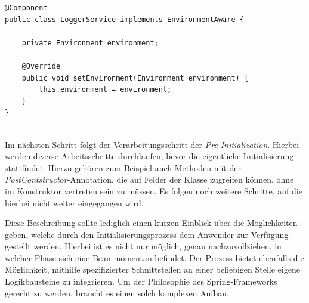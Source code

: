 \begin{lstlisting}[style=javaStyle,caption={Bean - EnvironmentAware \cite{bean-aware}},label=lst:bean-aware]
@Component
public class LoggerService implements EnvironmentAware {

	private Environment environment;

	@Override
	public void setEnvironment(Environment environment) {
		this.environment = environment;
	}
}


\end{lstlisting}
Im nächsten Schritt folgt der Verarbeitungsschritt der \emph{Pre-Initialization}. Hierbei werden diverse Arbeitsschritte durchlaufen, bevor die eigentliche Initialisierung stattfindet. Hierzu gehören zum Beispiel auch Methoden mit der \emph{PostContstructor}-Annotation, die auf Felder der Klasse zugreifen können, ohne im Konstruktor vertreten sein zu müssen. Es folgen noch weitere Schritte, auf die hierbei nicht weiter eingegangen wird. 

Diese Beschreibung sollte lediglich einen kurzen Einblick über die Möglichkeiten geben, welche durch den Initialisierungsprozess dem Anwender zur Verfügung gestellt werden. Hierbei ist es nicht nur möglich, genau nachzuvollziehen, in welcher Phase sich eine Bean momentan befindet. Der Prozess bietet ebenfalls die Möglichkeit, mithilfe spezifizierter Schnittstellen an einer beliebigen Stelle eigene Logikbausteine zu integrieren. Um der Philosophie des Spring-Frameworks gerecht zu werden, braucht es einen solch komplexen Aufbau. 


